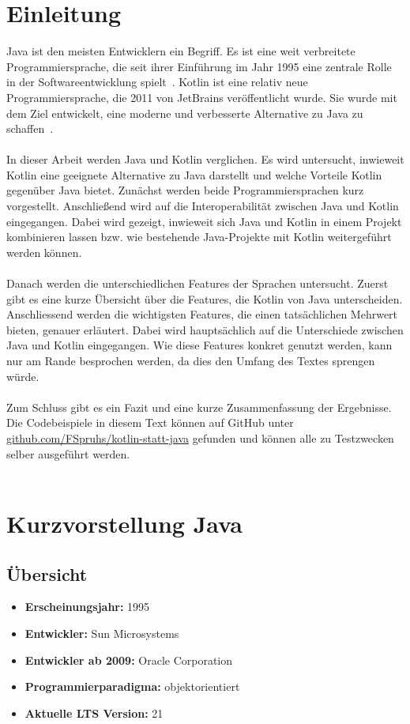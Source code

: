 \documentclass[11pt]{article}
\begin{document}
    \section{Einleitung}
    Java ist den meisten Entwicklern ein Begriff.
    Es ist eine weit verbreitete Programmiersprache, die seit ihrer Einführung im Jahr 1995 eine zentrale Rolle in der Softwareentwicklung spielt~\cite[54]{insel}.
    Kotlin ist eine relativ neue Programmiersprache, die 2011 von JetBrains veröffentlicht wurde.
    Sie wurde mit dem Ziel entwickelt, eine moderne und verbesserte Alternative zu Java zu schaffen~\cite[19]{kotlin-handbuch}.\\
    \\
    In dieser Arbeit werden Java und Kotlin verglichen.
    Es wird untersucht, inwieweit Kotlin eine geeignete Alternative zu Java darstellt und welche Vorteile Kotlin gegenüber Java bietet.
    Zunächst werden beide Programmiersprachen kurz vorgestellt.
    Anschließend wird auf die Interoperabilität zwischen Java und Kotlin eingegangen.
    Dabei wird gezeigt, inwieweit sich Java und Kotlin in einem Projekt kombinieren lassen bzw. wie bestehende Java-Projekte mit Kotlin weitergeführt werden können.\\
    \\
    Danach werden die unterschiedlichen Features der Sprachen untersucht.
    Zuerst gibt es eine kurze Übersicht über die Features, die Kotlin von Java unterscheiden.
    Anschliessend werden die wichtigsten Features, die einen tatsächlichen Mehrwert bieten, genauer erläutert.
    Dabei wird hauptsächlich auf die Unterschiede zwischen Java und Kotlin eingegangen.
    Wie diese Features konkret genutzt werden, kann nur am Rande besprochen werden, da dies den Umfang des Textes sprengen würde.\\
    \\
    Zum Schluss gibt es ein Fazit und eine kurze Zusammenfassung der Ergebnisse.
    Die Codebeispiele in diesem Text können auf GitHub unter \url{github.com/FSpruhs/kotlin-statt-java} gefunden und können alle zu Testzwecken selber ausgeführt werden.\\
    \\
    \section{Kurzvorstellung Java}

    \subsection{Übersicht}
    \begin{itemize}
        \item \textbf{Erscheinungsjahr:} 1995
        \item \textbf{Entwickler:} Sun Microsystems
        \item \textbf{Entwickler ab 2009:} Oracle Corporation
        \item \textbf{Programmierparadigma:} objektorientiert
        \item \textbf{Aktuelle LTS Version:} 21
    \end{itemize}
\end{document}
